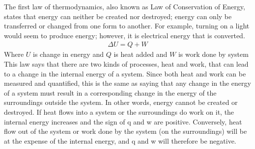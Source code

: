 \begin{chembox}{}
  {The first law of thermodynamics, also known as Law of Conservation of Energy, states that energy can neither be created nor destroyed; energy can only be transferred or changed from one form to another. For example, turning on a light would seem to produce energy; however, it is electrical energy that is converted.}
  \begin{align*}
  \Delta U = Q+W
  \end{align*}
  {Where $U$ is change in energy and $Q$ is heat added and $W$ is work done by system}
  {This law says that there are two kinds of processes, heat and work, that can lead to a change in the internal energy of a system. Since both heat and work can be measured and quantified, this is the same as saying that any change in the energy of a system must result in a corresponding change in the energy of the surroundings outside the system. In other words, energy cannot be created or destroyed. If heat flows into a system or the surroundings do work on it, the internal energy increases and the sign of q and w are positive. Conversely, heat flow out of the system or work done by the system (on the surroundings) will be at the expense of the internal energy, and q and w will therefore be negative.}
\end{chembox}
